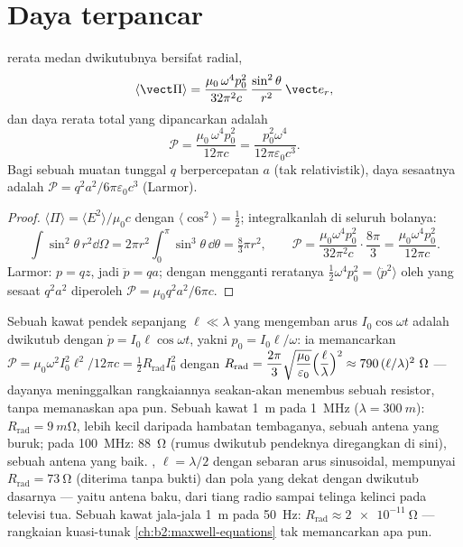 \section{Daya terpancar}

\begin{proposition}\label{prop:b2:dipole-radiation:power}
 rerata medan dwikutubnya bersifat radial,
\[
\langle\vect\Pi\rangle = \frac{\mu_0\,\omega^4p_0^2}{32\pi^2c}\,\frac{\sin^2\theta}{r^2}\,\vect e_r ,
\]
dan daya rerata total yang dipancarkan adalah
\[
\mathcal P = \frac{\mu_0\,\omega^4p_0^2}{12\pi c} = \frac{p_0^2\omega^4}{12\pi\varepsilon_0c^3} .
\]
Bagi sebuah muatan tunggal $q$ berpercepatan $a$ (tak relativistik),
daya sesaatnya adalah $\mathcal P = q^2a^2/6\pi\varepsilon_0c^3$ (Larmor).
\end{proposition}

\begin{proof}
$\langle\Pi\rangle = \langle E^2\rangle/\mu_0c$ dengan $\langle\cos^2\rangle = \tfrac12$;
integralkanlah di seluruh bolanya:
\[
\int\sin^2\theta\,r^2\dd\Omega = 2\pi r^2\int_0^\pi\sin^3\theta\,\dd\theta = \tfrac83\pi r^2 ,
\qquad
\mathcal P = \frac{\mu_0\omega^4p_0^2}{32\pi^2c}\cdot\frac{8\pi}3 = \frac{\mu_0\omega^4p_0^2}{12\pi c} .
\]
Larmor: $p = qz$, jadi $\ddot p = qa$;
dengan mengganti reratanya $\tfrac12\omega^4p_0^2 = \langle\ddot p^2\rangle$ oleh
yang sesaat $q^2a^2$ diperoleh $\mathcal P = \mu_0q^2a^2/6\pi c$.
\end{proof}

\begin{example}\label{ex:b2:dipole-radiation:antenna}
Sebuah kawat pendek sepanjang $\ell \ll \lambda$ yang mengemban arus $I_0\cos\omega t$ adalah
dwikutub dengan $\dot p = I_0\ell\cos\omega t$, yakni $p_0 = I_0\ell/\omega$: ia memancarkan
$\mathcal P = \mu_0\omega^2I_0^2\ell^2/12\pi c = \tfrac12R_{\text{rad}}I_0^2$ dengan
\emph{} $R_{\text{rad}} = \dfrac{2\pi}3\sqrt{\dfrac{\mu_0}{\varepsilon_0}}
\Bigl(\dfrac\ell\lambda\Bigr)^2 \approx 790\,(\ell/\lambda)^2\ \Omega$ --- dayanya meninggalkan
rangkaiannya seakan-akan menembus sebuah resistor, tanpa memanaskan apa pun. Sebuah kawat
\qty{1}{m} pada \qty{1}{MHz} ($\lambda = \qty{300}{m}$): $R_{\text{rad}} = \qty{9}{m\ohm}$, lebih kecil daripada
hambatan tembaganya, sebuah antena yang buruk; pada \qty{100}{MHz}: \qty{88}{\ohm} (rumus
dwikutub pendeknya diregangkan di sini), sebuah antena yang baik. \emph{}, $\ell = \lambda/2$ dengan sebaran arus sinusoidal, mempunyai
$R_{\text{rad}} = \qty{73}{\ohm}$ (diterima tanpa bukti) dan pola yang dekat dengan
dwikutub dasarnya --- yaitu antena baku, dari tiang radio sampai
telinga kelinci pada televisi tua. Sebuah kawat jala-jala \qty{1}{m} pada \qty{50}{Hz}:
$R_{\text{rad}} \approx \qty{2e-11}{\ohm}$ --- rangkaian kuasi-tunak
\cref{ch:b2:maxwell-equations} tak memancarkan apa pun.
\end{example}

